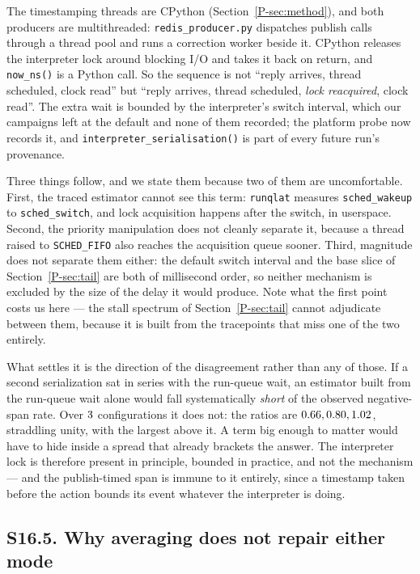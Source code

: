 \documentclass[10pt,journal,onecolumn]{IEEEtran}
\newcommand{\mainMethod}{\ref{P-sec:method}}            %
\newcommand{\mainSpectrum}{\ref{P-sec:tail}}        %
\begin{document}
The timestamping threads are CPython (Section~\mainMethod{}), and both producers are
multithreaded: \texttt{redis\_producer.py} dispatches publish calls through a thread pool and runs a
correction worker beside it. CPython releases the interpreter lock around blocking
I/O and takes it back on return, and \texttt{now\_ns()} is a Python call. So the sequence is
not ``reply arrives, thread scheduled, clock read'' but ``reply arrives, thread scheduled,
\emph{lock reacquired}, clock read''. The extra wait is bounded by the interpreter's switch
interval, which our campaigns left at the default and none of them recorded; the platform
probe now records it, and \texttt{interpreter\_serialisation()} is part of every future run's
provenance.

Three things follow, and we state them because two of them are uncomfortable. First, the
traced estimator cannot see this term: \texttt{runqlat} measures \texttt{sched\_wakeup} to
\texttt{sched\_switch}, and lock acquisition happens after the switch, in userspace. Second,
the priority manipulation does not cleanly separate it, because a thread raised to
\texttt{SCHED\_FIFO} also reaches the acquisition queue sooner. Third, magnitude does not
separate them either: the default switch interval and the base slice of Section~\mainSpectrum{} are both
of millisecond order, so neither mechanism is excluded by the size of the delay it would
produce. Note what the first point costs us here --- the stall spectrum of Section~\mainSpectrum{} cannot adjudicate between them, because it is built from the tracepoints that miss one of the two
entirely.

What settles it is the direction of the disagreement rather than any of those. If a second
serialization sat in series with the run-queue wait, an estimator built from the run-queue
wait alone would fall systematically \emph{short} of the observed negative-span rate. Over
$3$ configurations it does not: the ratios are $0.66, 0.80, 1.02$, straddling unity, with
the largest above it. A term big enough to matter would have to hide inside a spread that
already brackets the answer. The interpreter lock is therefore present in principle, bounded
in practice, and not the mechanism --- and the publish-timed span is immune to it entirely,
since a timestamp taken before the action bounds its event whatever the interpreter is doing.

\subsection{S16.5. Why averaging does not repair either mode}
\end{document}

